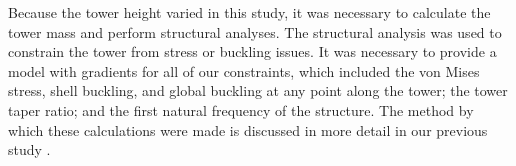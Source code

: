Because the tower height varied in this study, it was necessary to calculate the tower mass and perform structural analyses.
The structural analysis was used to constrain the tower from stress or buckling issues. 
It was necessary to provide a model with gradients for all of our constraints, which included the von Mises stress, shell buckling, and global buckling at any point along the tower; the tower taper ratio; and the first natural frequency of the structure. The method by which these calculations were made is discussed in more detail in our previous study \citep{stanley2018}.




\iffalse
A finite element model called TowerSE was developed at NREL that makes various calculations along the length of a tower \citep{ning2013towerse}. 
It is a powerful tool but does not provide analytic gradients. We optimized several wind farms using TowerSE and finite difference gradients, and consequently identified the shell buckling and first natural frequency as the only active constraints. We were then able to pull out the needed calculations from TowerSE and derive the associated gradients. 
\fi


